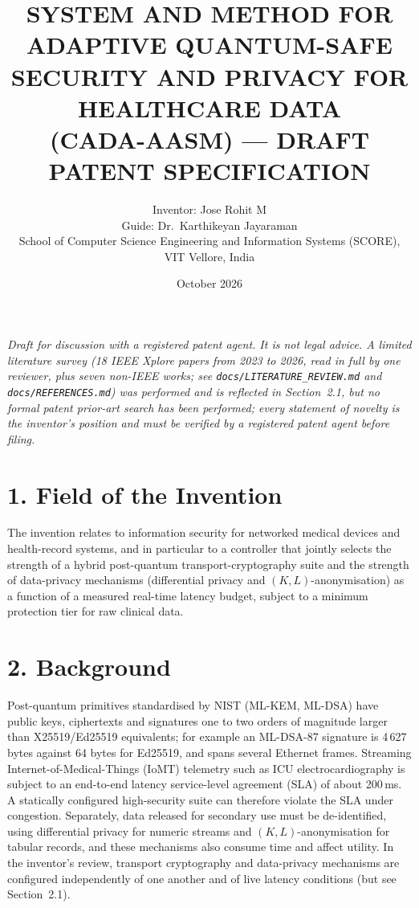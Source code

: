 \documentclass[11pt,a4paper]{article}
\title{\textbf{SYSTEM AND METHOD FOR ADAPTIVE QUANTUM-SAFE SECURITY AND PRIVACY FOR HEALTHCARE DATA}\\[4pt]\large (CADA-AASM) --- DRAFT PATENT SPECIFICATION}
\author{Inventor: Jose Rohit M\\ Guide: Dr.\ Karthikeyan Jayaraman\\ School of Computer Science Engineering and Information Systems (SCORE), VIT Vellore, India}
\date{October 2026}
\begin{document}
\maketitle
\noindent\textit{Draft for discussion with a registered patent agent. It is not legal advice. A limited literature survey (18 IEEE Xplore papers from 2023 to 2026, read in full by one reviewer, plus seven non-IEEE works; see \texttt{docs/LITERATURE\_REVIEW.md} and \texttt{docs/REFERENCES.md}) was performed and is reflected in Section~2.1, but \emph{no formal patent prior-art search has been performed}; every statement of novelty is the inventor's position and must be verified by a registered patent agent before filing.}

\section*{1. Field of the Invention}
The invention relates to information security for networked medical devices and health-record systems, and in particular to a controller that jointly selects the strength of a hybrid post-quantum transport-cryptography suite and the strength of data-privacy mechanisms (differential privacy and $(K,L)$-anonymisation) as a function of a measured real-time latency budget, subject to a minimum protection tier for raw clinical data.

\section*{2. Background}
Post-quantum primitives standardised by NIST (ML-KEM, ML-DSA) have public keys, ciphertexts and signatures one to two orders of magnitude larger than X25519/Ed25519 equivalents; for example an ML-DSA-87 signature is 4\,627 bytes against 64 bytes for Ed25519, and spans several Ethernet frames. Streaming Internet-of-Medical-Things (IoMT) telemetry such as ICU electrocardiography is subject to an end-to-end latency service-level agreement (SLA) of about 200\,ms. A statically configured high-security suite can therefore violate the SLA under congestion. Separately, data released for secondary use must be de-identified, using differential privacy for numeric streams and $(K,L)$-anonymisation for tabular records, and these mechanisms also consume time and affect utility. In the inventor's review, transport cryptography and data-privacy mechanisms are configured independently of one another and of live latency conditions (but see Section~2.1).
\end{document}

